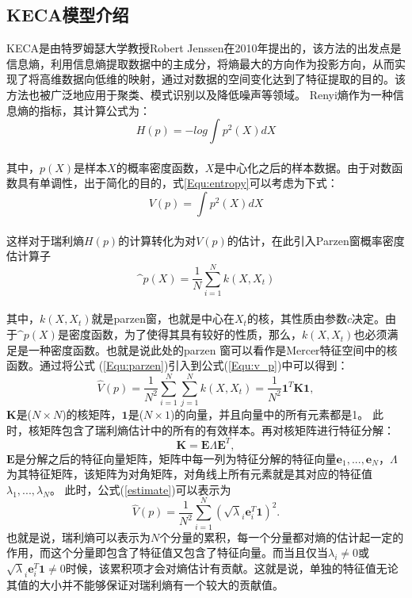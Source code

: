 \subsection{KECA模型介绍}
KECA是由特罗姆瑟大学教授Robert Jenssen在2010年提出的，该方法的出发点是信息熵，利用信息熵提取数据中的主成分，将熵最大的方向作为投影方向，从而实现了将高维数据向低维的映射，通过对数据的空间变化达到了特征提取的目的。该方法也被广泛地应用于聚类、模式识别以及降低噪声等领域。
Renyi熵作为一种信息熵的指标，其计算公式为：
\begin{equation}
\label{Equ:entropy}
H(p)=-log\int p^2(X)dX
\end{equation}\\
其中，$p(X)$是样本$X$的概率密度函数，$X$是中心化之后的样本数据。由于对数函数具有单调性，出于简化的目的，式\ref{Equ:entropy}可以考虑为下式：
\begin{equation}
\label{Equ:v_p}
V(p)= \int p^2(X)dX
\end{equation}\\
这样对于瑞利熵$H(p)$的计算转化为对$V(p)$的估计，在此引入Parzen窗概率密度估计算子
\begin{equation}
\label{Equ:parzen}
\^{p}(X)=\frac{1}{N}\sum \limits_{i=1}^{N}k(X,X_t)
\end{equation}\\
其中，$k(X,X_t)$就是parzen窗，也就是中心在$X_t$的核，其性质由参数$c$决定。由于$\^{p}(X)$是密度函数，为了使得其具有较好的性质，那么，$k(X,X_t)$也必须满足是一种密度函数。也就是说此处的parzen 窗可以看作是Mercer特征空间中的核函数。通过将公式
(\ref{Equ:parzen})引入到公式(\ref{Equ:v_p})中可以得到：
\begin{equation}\label{estimate}
\hat{V}(p)=\frac{1}{N^2}\sum \limits_{i=1}^{N}\sum \limits_{j=1}^{N}k(X,X_t)=\frac{1}{N^2}\textbf{1}^T\textbf{K}\textbf{1},
\end{equation}
$\textbf{K}$是($N\times N$)的核矩阵，$\textbf{1}$是($N\times 1$)的向量，并且向量中的所有元素都是1。 此时，核矩阵包含了瑞利熵估计中的所有的有效样本。再对核矩阵进行特征分解：
\begin{equation}
\textbf{K}=\textbf{E}\Lambda\textbf{E}^T,
\end{equation}
$\textbf{E}$是分解之后的特征向量矩阵，矩阵中每一列为特征分解的特征向量$\mathbf{e}_1,...,\mathbf{e}_N$，$\Lambda$为其特征矩阵，该矩阵为对角矩阵，对角线上所有元素就是其对应的特征值$\lambda_1,...,\lambda_N$。 此时，公式(\ref{estimate})可以表示为
\begin{equation}\label{eigdec}
\hat{V}(p)=\frac{1}{N^2}\sum \limits_{i=1}^{N}(\sqrt\lambda_i \mathbf{e}_i^T\textbf{1})^2.
\end{equation}%
也就是说，瑞利熵可以表示为$N$个分量的累积，每一个分量都对熵的估计起一定的作用，而这个分量即包含了特征值又包含了特征向量。而当且仅当$\lambda_i \neq 0$或 $\sqrt\lambda_i\mathbf{e}_i^T\textbf{1} \neq 0$时候，该累积项才会对熵估计有贡献。这就是说，单独的特征值无论其值的大小并不能够保证对瑞利熵有一个较大的贡献值。
